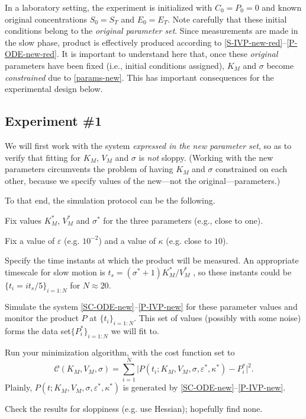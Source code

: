 \documentclass{article}
\newcommand{\eps}{\varepsilon}
\begin{document}
In a laboratory setting,
the experiment is initialized with $C_0 = P_0 = 0$
and known original concentrations $S_0=S_T$ and $E_0=E_T$.
Note carefully that these initial conditions
belong to the \emph{original parameter set}.
Since measurements are made in the slow phase,
product is effectively produced
according to \eqref{S-IVP-new-red}--\eqref{P-ODE-new-red}.
It is important to understand here that,
once these \emph{original} parameters have been fixed
(i.e., initial conditions assigned),
$K_M$ and $\sigma$ become \emph{constrained} due to \eqref{params-new}.
This has important consequences
for the experimental design below.

\subsection{Experiment \#1}
%
We will first work with the system
\textit{expressed in the new parameter set},
so as to verify that fitting for $K_M$, $V_M$ and $\sigma$
is \textit{not} sloppy.
(Working with the new parameters circumvents the problem
of having $K_M$ and $\sigma$ constrained on each other,
because we specify values of the new---not the original---parameters.)

To that end, the simulation protocol can be the following.

Fix values $K^*_M$, $V^*_M$ and $\sigma^*$ for the three parameters
(e.g., close to one).

Fix a value of $\eps$ (e.g. $10^{-2}$) and a value of $\kappa$
(e.g. close to $10$).

Specify the time instants at which the product will be measured.
An appropriate timescale for slow motion
is $t_s = (\sigma^*+1)K^*_M/V^*_M$ \cite{SS89},
so these instants could be $\{t_i = i t_s/5\}_{i=1:N}$
for $N \approx 20$.

Simulate the system \eqref{SC-ODE-new}--\eqref{P-IVP-new}
for these parameter values and monitor the product $P$
at $\{t_i\}_{i=1:N}$.
This set of values (possibly with some noise)
forms the data set$\{P^*_i\}_{i=1:N}$ we will fit to.

Run your minimization algorithm,
with the cost function set to
%
\[
 \mathcal{C}(K_M,V_M,\sigma)
=
 \sum_{i=1}^N
 \vert
 P(t_i ; K_M,V_M,\sigma,\eps^*,\kappa^*)
-
 P^*_i
 \vert^2 .
\]
%
Plainly, $P(t ; K_M,V_M,\sigma,\eps^*,\kappa^*)$
is generated by \eqref{SC-ODE-new}--\eqref{P-IVP-new}.

Check the results for sloppiness (e.g. use Hessian);
hopefully find none.
\end{document}

